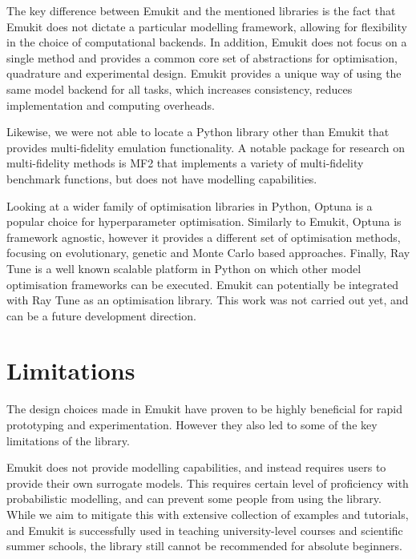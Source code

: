 The key difference between Emukit and the mentioned libraries is the fact that Emukit does not dictate a particular modelling framework, allowing for flexibility in the choice of computational backends. In addition, Emukit does not focus on a single method and provides a common core set of abstractions for optimisation, quadrature and experimental design. Emukit provides a unique way of using the same model backend for all tasks, which increases consistency, reduces implementation and computing overheads.

Likewise, we were not able to locate a Python library other than Emukit that provides multi-fidelity emulation functionality. A notable package for research on multi-fidelity methods is MF2 \cite{vanRijn2020} that implements a variety of multi-fidelity benchmark functions, but does not have modelling capabilities.

Looking at a wider family of optimisation libraries in Python, Optuna \cite{optuna_2019} is a popular choice for hyperparameter optimisation. Similarly to Emukit, Optuna is framework agnostic, however it provides a different set of optimisation methods, focusing on evolutionary, genetic and Monte Carlo based approaches. Finally, Ray Tune \cite{liaw2018tune} is a well known scalable platform in Python on which other model optimisation frameworks can be executed. Emukit can potentially be integrated with Ray Tune as an optimisation library. This work was not carried out yet, and can be a future development direction.

\section{Limitations}\label{section:limitations}
The design choices made in Emukit have proven to be highly beneficial for rapid prototyping and experimentation. However they also led to some of the key limitations of the library.

Emukit does not provide modelling capabilities, and instead requires users to provide their own surrogate models. This requires certain level of proficiency with probabilistic modelling, and can prevent some people from using the library. While we aim to mitigate this with extensive collection of examples and tutorials, and Emukit is successfully used in teaching university-level courses and scientific summer schools, the library still cannot be recommended for absolute beginners.

